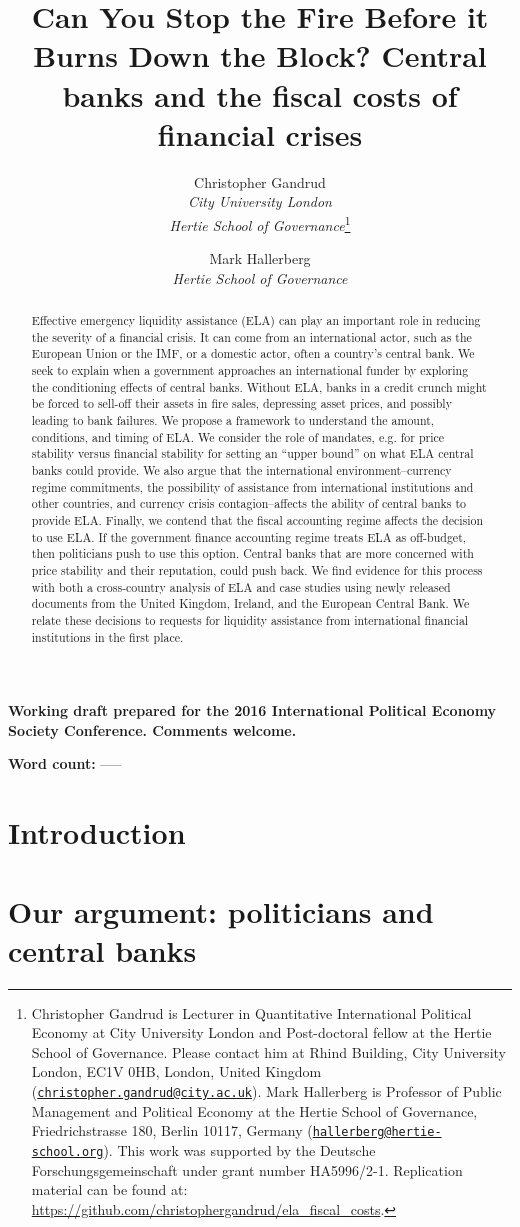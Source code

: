 \documentclass[]{article}
\title{Can You Stop the Fire Before it Burns Down the Block? Central banks and the fiscal costs of financial crises}
\author{Christopher Gandrud \\ \emph{City University London} \\ \emph{Hertie School of Governance}\footnote{Christopher Gandrud is Lecturer in Quantitative International Political Economy at City University London and Post-doctoral fellow at the Hertie School of Governance. Please contact him at Rhind Building, City University London, EC1V 0HB, London, United Kingdom
(\href{mailto:christopher.gandrud@city.ac.uk}{\nolinkurl{christopher.gandrud@city.ac.uk}}). Mark Hallerberg is Professor of Public Management and Political Economy at the Hertie School of Governance, Friedrichstrasse 180, Berlin 10117, Germany (\href{mailto:hallerberg@hertie-school.org}{\nolinkurl{hallerberg@hertie-school.org}}). This work was supported by the Deutsche Forschungsgemeinschaft under grant number HA5996/2-1. Replication material can be found at: \url{https://github.com/christophergandrud/ela_fiscal_costs}.}
\and
Mark Hallerberg \\ \emph{Hertie School of Governance}}
\begin{document}
\maketitle


\noindent \textbf{Working draft prepared for the 2016 International Political Economy Society Conference. Comments welcome.}

\begin{abstract}
Effective emergency liquidity assistance (ELA) can play an important role in reducing the severity of a financial crisis. It can come from an international actor, such as the European Union or the IMF, or a domestic actor, often a country's central bank.
 We seek to explain when a government approaches an international funder by exploring the conditioning effects of central banks. Without ELA, banks in a credit crunch might be forced to sell-off their assets in fire sales, depressing asset prices, and possibly leading to bank failures. We propose a framework to understand
 the amount, conditions, and timing of ELA. We consider the role
of mandates, e.g. for price stability versus financial
stability for setting an ``upper bound'' on what ELA central banks could provide. We also argue that the international environment--currency regime commitments, the possibility of assistance from international institutions and other countries, and currency crisis contagion--affects the ability of central banks to provide ELA. Finally, we contend that the fiscal accounting regime affects the decision to use ELA. If the government finance accounting regime treats ELA as off-budget, then politicians push to use this option. Central banks that are more concerned with price stability and their reputation, could push back. We find evidence for this process with both a cross-country analysis of ELA and case studies using newly released documents from the United Kingdom, Ireland, and the European Central Bank. We relate these decisions to requests for liquidity assistance from international financial institutions in the first place.
\end{abstract}

\textbf{Word count:} -----

\section{Introduction}

\section{Our argument: politicians and central banks}
\end{document}
